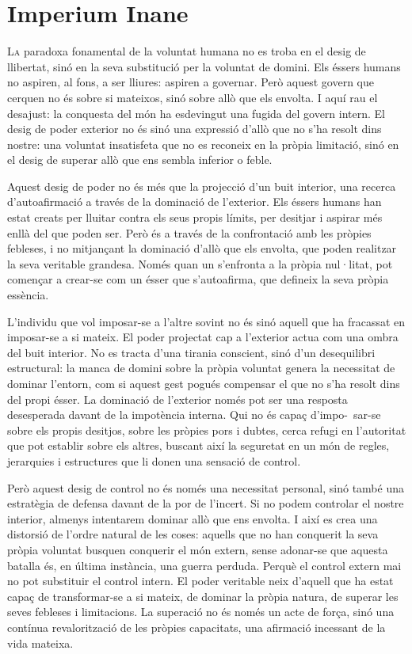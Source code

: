 \chapter{Imperium Inane}


\lettrine[loversize=0.2, lines=2]{L}{a} paradoxa fonamental de la voluntat humana no es troba en el desig de llibertat, sinó en la seva substitució per la voluntat de domini. Els éssers humans no aspiren, al fons, a ser lliures: aspiren a governar. Però aquest govern que cerquen no és sobre si mateixos, sinó sobre allò que els envolta. I aquí rau el desajust: la conquesta del món ha esdevingut una fugida del govern intern. El desig de poder exterior no és sinó una expressió d’allò que no s’ha resolt dins nostre: una voluntat insatisfeta que no es reconeix en la pròpia limitació, sinó en el desig de superar allò que ens sembla inferior o feble.

Aquest desig de poder no és més que la projecció d’un buit interior, una recerca d’autoafirmació a través de la dominació de l’exterior. Els éssers humans han estat creats per lluitar contra els seus propis límits, per desitjar i aspirar més enllà del que poden ser. Però és a través de la confrontació amb les pròpies febleses, i no mitjançant la dominació d’allò que els envolta, que poden realitzar la seva veritable grandesa. Només quan un s’enfronta a la pròpia nul·litat, pot començar a crear-se com un ésser que s’autoafirma, que defineix la seva pròpia essència.

L’individu que vol imposar-se a l’altre sovint no és sinó aquell que ha fracassat en imposar-se a si mateix. El poder projectat cap a l'exterior actua com una ombra del buit interior. No es tracta d’una tirania conscient, sinó d’un desequilibri estructural: la manca de domini sobre la pròpia voluntat genera la necessitat de dominar l’entorn, com si aquest gest pogués compensar el que no s’ha resolt dins del propi ésser. La dominació de l’exterior només pot ser una resposta desesperada davant de la impotència interna. Qui no és capaç d’impo-\ sar-se sobre els propis desitjos, sobre les pròpies pors i dubtes, cerca refugi en l’autoritat que pot establir sobre els altres, buscant així la seguretat en un món de regles, jerarquies i estructures que li donen una sensació de control.

Però aquest desig de control no és només una necessitat personal, sinó també una estratègia de defensa davant de la por de l’incert. Si no podem controlar el nostre interior, almenys intentarem dominar allò que ens envolta. I així es crea una distorsió de l’ordre natural de les coses: aquells que no han conquerit la seva pròpia voluntat busquen conquerir el món extern, sense adonar-se que aquesta batalla és, en última instància, una guerra perduda. Perquè el control extern mai no pot substituir el control intern. El poder veritable neix d’aquell que ha estat capaç de transformar-se a si mateix, de dominar la pròpia natura, de superar les seves febleses i limitacions. La superació no és només un acte de força, sinó una contínua revalorització de les pròpies capacitats, una afirmació incessant de la vida mateixa.

